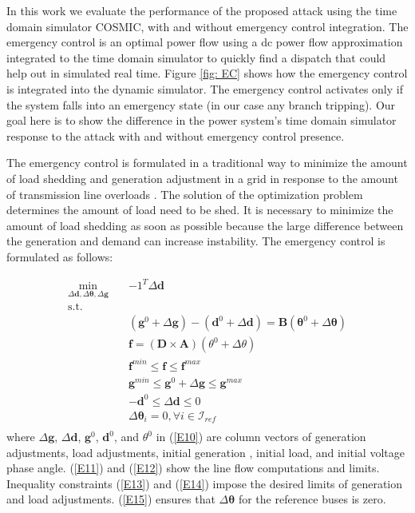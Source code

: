 \documentclass[journal]{IEEEtran}
\begin{document}
In this work we evaluate the performance of the proposed attack using the time domain simulator COSMIC, with and without emergency control integration. The emergency control is an optimal power flow using a dc power flow approximation integrated to the time domain simulator to quickly find a dispatch that could help out in simulated real time. Figure \ref{fig: EC} shows how the emergency control is integrated into the dynamic simulator. The emergency control activates only if the system falls into an emergency state (in our case any branch tripping). Our goal here is to show the difference in the power system's time domain simulator response to the attack with and without emergency control presence.  


The emergency control is formulated in a traditional way to minimize the amount of load shedding and generation adjustment in a grid in response to the amount of transmission line overloads \cite{EC,EC1,EC2}. The solution of the optimization problem determines the amount of load need to be shed. It is necessary to minimize the amount of load shedding as soon as possible because the large difference between the generation and demand can increase instability. The emergency control is formulated as follows: 

\begin{align}
\min_{\Delta \mathbf{d}, \Delta \boldsymbol{ \theta }, \Delta \mathbf{g}} \quad & -1^T \Delta \mathbf{d} \label{E9}\\
\textrm{s.t.} \nonumber\\
\quad & (\mathbf{g}^0+\Delta \mathbf{g})-(\mathbf{d}^0+\Delta \mathbf{d}) = \mathbf{B}(\boldsymbol{\theta}^0+\Delta \boldsymbol{\theta}) \label{E10}\\
\quad & \mathbf{f} = (\mathbf{D}\times \mathbf{A})(\theta^0 + \Delta \theta) \label{E11}\\
\quad & \mathbf{f}^{min} \leq \mathbf{f} \leq \mathbf{f}^{max} \label{E12}\\
\quad &  \mathbf{g}^{ min} \leq \mathbf{g}^0 +\Delta \mathbf{g} \leq  \mathbf{g}^{ max} \label{E13}\\
\quad &  - \mathbf{d}^0 \leq \Delta \mathbf{d} \leq  0  \label{E14} \\
\quad &  \Delta \boldsymbol{\theta}_i = 0, \forall i \in  \mathcal{I}_{ref} \label{E15} \\ \nonumber
\end{align}
where $\Delta \mathbf{g}$, $\Delta \mathbf{d}$, $\mathbf{g}^0$, $ \mathbf{d}^0 $, and $\theta^0$ in (\ref{E10}) are column vectors of generation adjustments, load adjustments, initial generation , initial load, and initial voltage phase angle. (\ref{E11}) and (\ref{E12}) show the line flow computations and limits. Inequality constraints (\ref{E13}) and (\ref{E14}) impose the desired limits of generation and load adjustments. (\ref{E15}) ensures that $ \Delta \boldsymbol{\theta}$ for the reference buses is zero.
\end{document}
